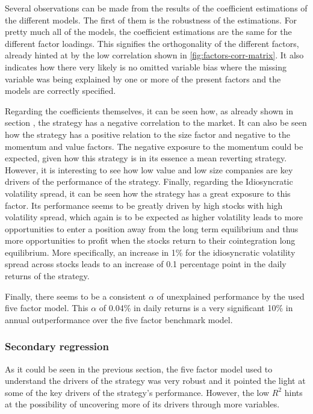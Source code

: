 Several observations can be made from the results of the coefficient estimations of the different models. The first of them is the robustness of the estimations. For pretty much all of the models, the coefficient estimations are the same for the different factor loadings. This signifies the orthogonality of the different factors, already hinted at by the low correlation shown in \autoref{fig:factors-corr-matrix}. It also indicates how there very likely is no omitted variable bias where the missing variable was being explained by one or more of the present factors and the models are correctly specified.

Regarding the coefficients themselves, it can be seen how, as already shown in section , the strategy has a negative correlation to the market. It can also be seen how the strategy has a positive relation to the size factor and negative to the momentum and value factors. The negative exposure to the momentum could be expected, given how this strategy is in its essence a mean reverting strategy. However, it is interesting to see how low value and low size companies are key drivers of the performance of the strategy. Finally, regarding the Idiosyncratic volatility spread, it can be seen how the strategy has a great exposure to this factor. Its performance seems to be greatly driven by high stocks with high volatility spread, which again is to be expected as higher volatility leads to more opportunities to enter a position away from the long term equilibrium and thus more opportunities to profit when the stocks return to their cointegration long equilibrium. More specifically, an increase in 1\% for the idiosyncratic volatility spread across stocks leads to an increase of 0.1 percentage point in the daily returns of the strategy. 

Finally, there seems to be a consistent $\alpha$ of unexplained performance by the used five factor model. This $\alpha$ of 0.04\% in daily returns is a very significant 10\% in annual outperformance over the five factor benchmark model. 

\subsubsection{Secondary regression}
As it could be seen in the previous section, the five factor model used to understand the drivers of the strategy was very robust and it pointed the light at some of the key drivers of the strategy's performance. However, the low $R^2$ hints at the possibility of uncovering more of its drivers through more variables. 

